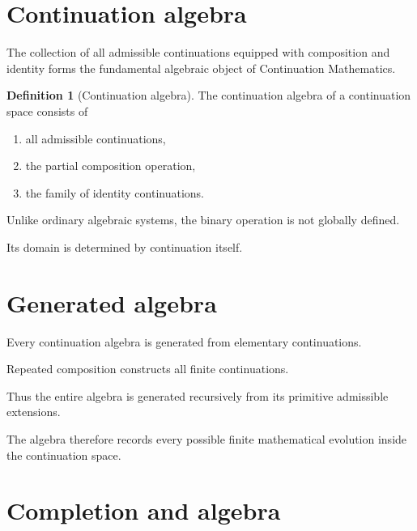 \documentclass[13pt,openany]{book}
\theoremstyle{plain}
\theoremstyle{definition}
\newtheorem{definition}{Definition}[chapter]
\begin{document}
\section{Continuation algebra}

The collection of all admissible continuations equipped with composition and
identity forms the fundamental algebraic object of Continuation Mathematics.

\begin{definition}[Continuation algebra]
The continuation algebra of a continuation space consists of

\begin{enumerate}
\item all admissible continuations,

\item the partial composition operation,

\item the family of identity continuations.
\end{enumerate}
\end{definition}

Unlike ordinary algebraic systems, the binary operation is not globally
defined.

Its domain is determined by continuation itself.

\section{Generated algebra}

Every continuation algebra is generated from elementary continuations.

Repeated composition constructs all finite continuations.

Thus the entire algebra is generated recursively from its primitive admissible
extensions.

The algebra therefore records every possible finite mathematical evolution
inside the continuation space.

\section{Completion and algebra}
\end{document}
